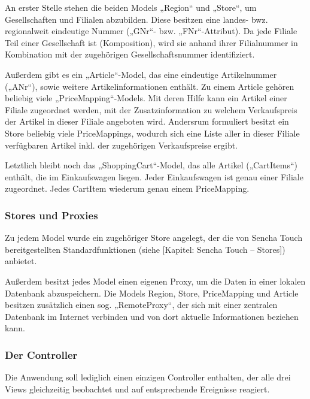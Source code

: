 
An erster Stelle stehen die beiden Models „Region“ und „Store“, um Gesellschaften und Filialen abzubilden. Diese besitzen eine landes- bwz. regionalweit eindeutige Nummer („GNr“- bzw. „FNr“-Attribut). Da jede Filiale Teil einer Gesellschaft ist (Komposition), wird sie anhand ihrer Filialnummer in Kombination mit der zugehörigen Gesellschaftsnummer identifiziert.

Außerdem gibt es ein „Article“-Model, das eine eindeutige Artikelnummer („ANr“), sowie weitere Artikelinformationen enthält. Zu einem Article gehören beliebig viele „PriceMapping“-Models. Mit deren Hilfe kann ein Artikel einer Filiale zugeordnet werden, mit der Zusatzinformation zu welchem Verkaufspreis der Artikel in dieser Filiale angeboten wird. Andersrum formuliert besitzt ein Store beliebig viele PriceMappings, wodurch sich eine Liste aller in dieser Filiale verfügbaren Artikel inkl. der zugehörigen Verkaufspreise ergibt.

Letztlich bleibt noch das „ShoppingCart“-Model, das alle Artikel („CartItems“) enthält, die im Einkaufswagen liegen. Jeder Einkaufswagen ist genau einer Filiale zugeordnet. Jedes CartItem wiederum genau einem PriceMapping.

\subsubsection*{Stores und Proxies}
Zu jedem Model wurde ein zugehöriger Store angelegt, der die von Sencha Touch bereitgestellten Standardfunktionen (siehe [Kapitel: Sencha Touch – Stores]) anbietet. 

Außerdem besitzt jedes Model einen eigenen Proxy, um die Daten in einer lokalen Datenbank abzuspeichern. Die Models Region, Store, PriceMapping und Article besitzen zusätzlich einen sog. „RemoteProxy“, der sich mit einer zentralen Datenbank im Internet verbinden und von dort aktuelle Informationen beziehen kann.

\subsubsection*{Der Controller}
Die Anwendung soll lediglich einen einzigen Controller enthalten, der alle drei Views gleichzeitig beobachtet und auf entsprechende Ereignisse reagiert. %


